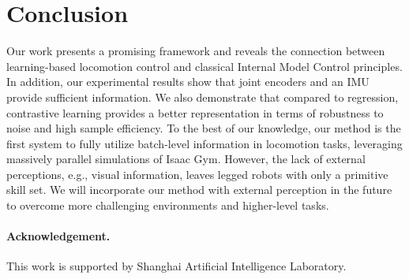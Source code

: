 
\section{Conclusion}

Our work presents a promising framework and reveals the connection between learning-based locomotion control and classical Internal Model Control principles.
In addition, our experimental results show that joint encoders and an IMU provide sufficient information.
We also demonstrate that compared to regression, contrastive learning provides a better representation in terms of robustness to noise and high sample efficiency.
To the best of our knowledge, our method is the first system to fully utilize batch-level information in locomotion tasks, leveraging massively parallel simulations of Isaac Gym.
However, the lack of external perceptions, e.g., visual information, leaves legged robots with only a primitive skill set.
We will incorporate our method with external perception in the future to overcome more challenging environments and higher-level tasks.

\paragraph{Acknowledgement.} 
This work is supported by Shanghai Artificial Intelligence Laboratory.